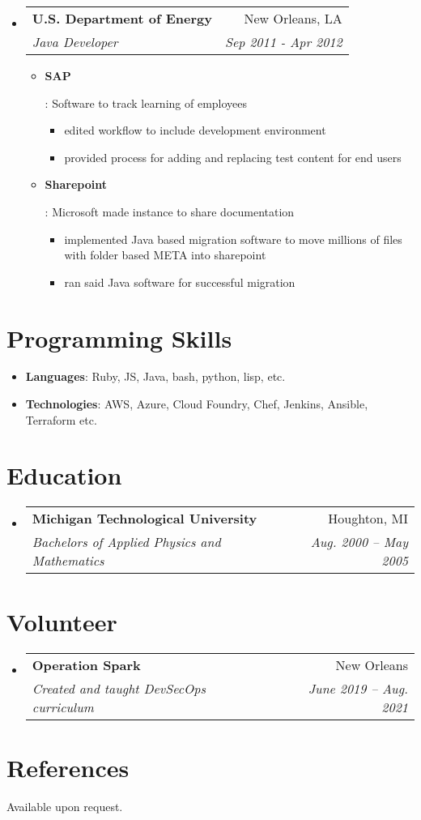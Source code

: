 \documentclass[letterpaper, 10pt]{extarticle}
\makeatletter
\newcommand{\resumeItem}[2]{
\item\small{
    \textbf{#1}{: #2 \vspace{-2pt}}
  }
}
\newcommand{\resumeSubheading}[4]{
  \vspace{-1pt}\item{
    \begin{tabular*}{0.97\textwidth}{l@{\extracolsep{\fill}}r}
      \textbf{#1} & #2 \\
      \textit{\small#3} & \textit{\small #4} \\
    \end{tabular*}\vspace{-5pt}}
}
\newcommand{\resumeSubHeadingListStart}{\begin{itemize}[leftmargin=*]}
\newcommand{\resumeSubHeadingListEnd}{\end{itemize}}
\newcommand{\resumeItemListStart}{\justify\begin{itemize}}
\newcommand{\resumeItemListEnd}{\end{itemize}\vspace{-5pt}}
\makeatother
\begin{document}
\resumeSubHeadingListStart
\resumeSubheading
{U.S. Department of Energy}{New Orleans, LA}
{Java Developer}{Sep 2011 - Apr 2012}
\resumeItemListStart
\resumeItem{SAP}
{Software to track learning of employees

  \begin{itemize}
    \item edited workflow to include development environment
    \item provided process for adding and replacing test content for end users
  \end{itemize}

}

\resumeItem{Sharepoint}
{Microsoft made instance to share documentation

  \begin{itemize}
    \item implemented Java based migration software to move millions of files with folder based META into sharepoint
    \item ran said Java software for successful migration
  \end{itemize}

}
\resumeItemListEnd
\resumeSubHeadingListEnd


\section{Programming Skills}
\resumeSubHeadingListStart
\item{
            \textbf{Languages}{: Ruby, JS, Java, bash, python, lisp, etc.}
      }
\item{
            \textbf{Technologies}{: AWS, Azure, Cloud Foundry, Chef, Jenkins, Ansible, Terraform etc.}
      }
\resumeSubHeadingListEnd

\section{Education}
\resumeSubHeadingListStart
\resumeSubheading
{Michigan Technological University}{Houghton, MI}
{Bachelors of Applied Physics and Mathematics}{Aug. 2000 -- May 2005}
\resumeSubHeadingListEnd

\section{Volunteer}
\resumeSubHeadingListStart
\resumeSubheading
{Operation Spark}{New Orleans}
{Created and taught DevSecOps curriculum}{June 2019 -- Aug. 2021}
\resumeSubHeadingListEnd


\section{References}
Available upon request.

\end{document}
